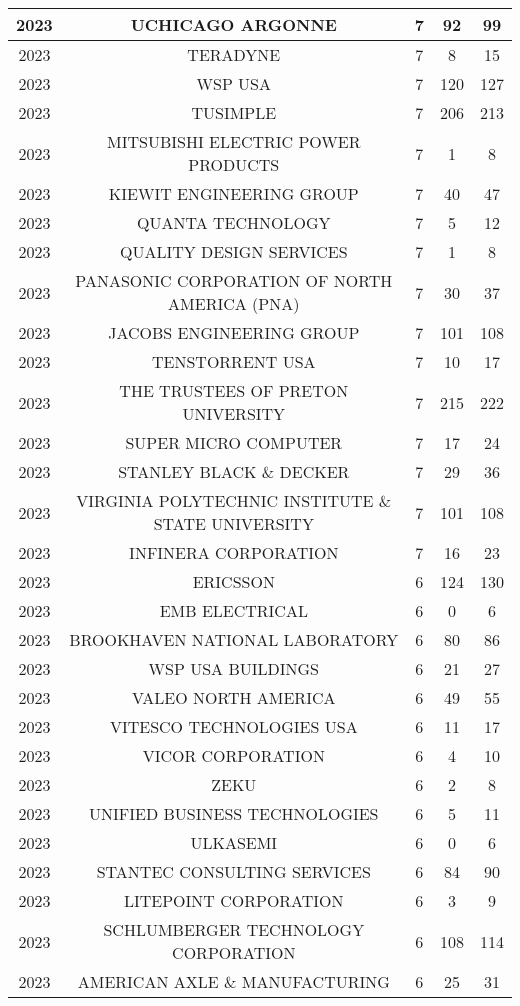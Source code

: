 \documentclass{article}%
\begin{document}
\begin{longtable}{c|c|c|c|c}
\hline%
2023&UCHICAGO ARGONNE&7&92&99\\%
\hline%
2023&TERADYNE&7&8&15\\%
\hline%
2023&WSP USA&7&120&127\\%
\hline%
2023&TUSIMPLE&7&206&213\\%
\hline%
2023&MITSUBISHI ELECTRIC POWER PRODUCTS&7&1&8\\%
\hline%
2023&KIEWIT ENGINEERING GROUP&7&40&47\\%
\hline%
2023&QUANTA TECHNOLOGY&7&5&12\\%
\hline%
2023&QUALITY DESIGN SERVICES&7&1&8\\%
\hline%
2023&PANASONIC CORPORATION OF NORTH AMERICA (PNA)&7&30&37\\%
\hline%
2023&JACOBS ENGINEERING GROUP&7&101&108\\%
\hline%
2023&TENSTORRENT USA&7&10&17\\%
\hline%
2023&THE TRUSTEES OF PRETON UNIVERSITY&7&215&222\\%
\hline%
2023&SUPER MICRO COMPUTER&7&17&24\\%
\hline%
2023&STANLEY BLACK \& DECKER&7&29&36\\%
\hline%
2023&VIRGINIA POLYTECHNIC INSTITUTE \& STATE UNIVERSITY&7&101&108\\%
\hline%
2023&INFINERA CORPORATION&7&16&23\\%
\hline%
2023&ERICSSON&6&124&130\\%
\hline%
2023&EMB ELECTRICAL&6&0&6\\%
\hline%
2023&BROOKHAVEN NATIONAL LABORATORY&6&80&86\\%
\hline%
2023&WSP USA BUILDINGS&6&21&27\\%
\hline%
2023&VALEO NORTH AMERICA&6&49&55\\%
\hline%
2023&VITESCO TECHNOLOGIES USA&6&11&17\\%
\hline%
2023&VICOR CORPORATION&6&4&10\\%
\hline%
2023&ZEKU&6&2&8\\%
\hline%
2023&UNIFIED BUSINESS TECHNOLOGIES&6&5&11\\%
\hline%
2023&ULKASEMI&6&0&6\\%
\hline%
2023&STANTEC CONSULTING SERVICES&6&84&90\\%
\hline%
2023&LITEPOINT CORPORATION&6&3&9\\%
\hline%
2023&SCHLUMBERGER TECHNOLOGY CORPORATION&6&108&114\\%
\hline%
2023&AMERICAN AXLE \& MANUFACTURING&6&25&31\\%
\hline%

\end{longtable}
\end{document}
